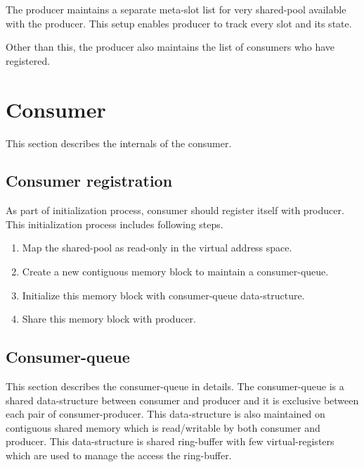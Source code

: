 \documentclass[a4paper,twoside]{report} %
\begin{document}
The producer maintains a separate meta-slot list for very shared-pool
available with the producer.  This setup enables producer to track 
every slot and its state.

Other than this, the producer also maintains the list of consumers who
have registered.

\section{Consumer}
This section describes the internals of the consumer.

\subsection{Consumer registration}
As part of initialization process, consumer should register itself
with producer.  This initialization process includes following steps.
\begin{enumerate} 
  \item Map the shared-pool as read-only in the virtual
  address space.
  \item Create a new contiguous memory block to maintain a consumer-queue.
  \item Initialize this memory block with consumer-queue
  data-structure. 
  \item Share this memory block with producer.
\end{enumerate} 


\subsection{Consumer-queue}
This section describes the consumer-queue in details.
The consumer-queue is a shared data-structure between consumer and
producer and it is exclusive between each pair of consumer-producer.
This data-structure is also maintained on contiguous shared memory 
which is read/writable by both consumer and producer.  This
data-structure is shared ring-buffer with few virtual-registers 
which are used to manage the access the ring-buffer.
\end{document}
